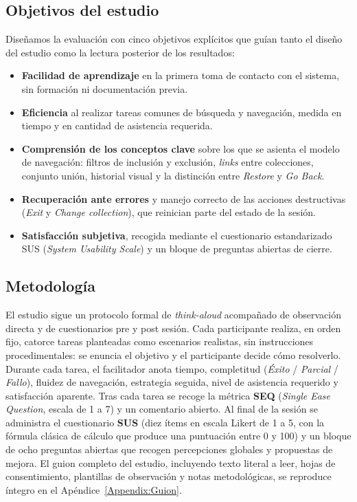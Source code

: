 \subsection{Objetivos del estudio}

Diseñamos la evaluación con cinco objetivos explícitos que guían tanto el diseño del estudio
como la lectura posterior de los resultados:

\begin{itemize}
\item \textbf{Facilidad de aprendizaje} en la primera toma de contacto con el sistema, sin
formación ni documentación previa.

\item \textbf{Eficiencia} al realizar tareas comunes de búsqueda y navegación, medida en
tiempo y en cantidad de asistencia requerida.

\item \textbf{Comprensión de los conceptos clave} sobre los que se asienta el modelo de
navegación: filtros de inclusión y exclusión, \textit{links} entre colecciones, conjunto
unión, historial visual y la distinción entre \textit{Restore} y \textit{Go Back}.

\item \textbf{Recuperación ante errores} y manejo correcto de las acciones destructivas
(\textit{Exit} y \textit{Change collection}), que reinician parte del estado de la sesión.

\item \textbf{Satisfacción subjetiva}, recogida mediante el cuestionario estandarizado SUS
(\textit{System Usability Scale}) y un bloque de preguntas abiertas de cierre.
\end{itemize}

\subsection{Metodología}

El estudio sigue un protocolo formal de \textit{think-aloud} acompañado de observación
directa y de cuestionarios pre y post sesión. Cada participante realiza, en orden fijo,
catorce tareas planteadas como escenarios realistas, sin instrucciones procedimentales:
se enuncia el objetivo y el participante decide cómo resolverlo. Durante cada tarea, el
facilitador anota tiempo, completitud (\textit{Éxito} / \textit{Parcial} / \textit{Fallo}),
fluidez de navegación, estrategia seguida, nivel de asistencia requerido y satisfacción
aparente. Tras cada tarea se recoge la métrica \textbf{SEQ} (\textit{Single Ease Question},
escala de 1 a 7) y un comentario abierto. Al final de la sesión se administra el cuestionario
\textbf{SUS} (diez ítems en escala Likert de 1 a 5, con la fórmula clásica de cálculo que
produce una puntuación entre 0 y 100) y un bloque de ocho preguntas abiertas que recogen
percepciones globales y propuestas de mejora. El guion completo del estudio, incluyendo
texto literal a leer, hojas de consentimiento, plantillas de observación y notas
metodológicas, se reproduce íntegro en el Apéndice~\ref{Appendix:Guion}.

